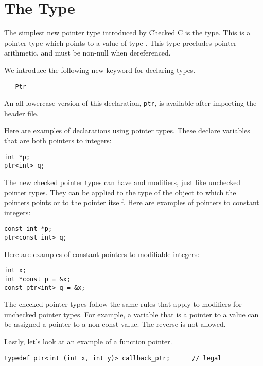 
\chapter{The \ptrT Type}
\label{chapter:ptrs}

The simplest new pointer type introduced by Checked C
is the \ptrT type. This is a pointer type which points
to a value of type . This type precludes pointer
arithmetic, and must be non-null when dereferenced.

We introduce the following new keyword for declaring \ptrT
types.

\begin{lstlisting}
  _Ptr
\end{lstlisting}

An all-lowercase version of this declaration, \lstinline{ptr}, is available
after importing the  header file.

Here are  examples of declarations using \ptrT pointer types. These declare variables that
are both pointers to integers:

\begin{lstlisting}
int *p;
ptr<int> q;
\end{lstlisting}

The new checked pointer types can have  and 
modifiers, just like unchecked pointer types. They can be applied to the type
of the object to which the pointers points or to the pointer itself. Here are examples
of pointers to constant integers:

\begin{lstlisting}
const int *p;
ptr<const int> q;
\end{lstlisting}

Here are examples of constant pointers to modifiable integers:

\begin{lstlisting}
int x;
int *const p = &x;
const ptr<int> q = &x;
\end{lstlisting}

The checked pointer types follow the same rules that apply to modifiers for
unchecked pointer types.  For example, a variable that is a pointer to a
 value can be assigned a pointer to a non-const value.
The reverse is not allowed.

Lastly, let's look at an example of a function pointer.

\begin{lstlisting}
typedef ptr<int (int x, int y)> callback_ptr;      // legal
\end{lstlisting}


